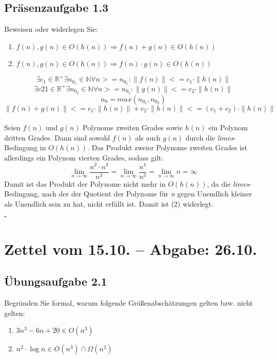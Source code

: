 \documentclass{article}
\begin{document}
\subsection{Präsenzaufgabe 1.3}
Beweisen oder widerlegen Sie:
\begin{enumerate}
	\item $ f(n),g(n) \in O(h(n)) \Rightarrow f(n)+g(n) \in O(h(n)) $
	\item $ f(n),g(n) \in O(h(n)) \Rightarrow f(n) \cdot g(n) \in O(h(n)) $
\end{enumerate}
\vspace{1cm}
\[
	\exists c_1 \in \mathbb{R}^+ \exists n_{0_1} \in \mathbb{N} \forall n >= n_{0_1} : \|f(n)\| <= c_1 \cdot \|h(n)\|
\]
\[
	\exists c21 \in \mathbb{R}^+ \exists n_{0_2} \in \mathbb{N} \forall n >= n_{0_2} : \|g(n)\| <= c_2 \cdot \|h(n)\|
\]
\[
	n_0 = max(n_{0_1},n_{0_2})
\]
\[
	\|f(n)+g(n)\| <= c_1\cdot\|h(n)\|+c_2\cdot\|h(n)\| <= (c_1+c_2)\cdot\|h(n)\|
\]
\vspace{0.5cm}\\
Seien $f(n)$ und $g(n)$ Polynome zweiten Grades sowie $h(n)$ ein Polynom dritten Grades.
Dann sind sowohl $f(n)$ als auch $g(n)$ durch die \textit{limes}-Bedingung in $O(h(n))$.
Das Produkt zweier Polynome zweiten Grades ist allerdings ein Polynom vierten Grades, sodass gilt:
\begin{equation*}
	\lim_{n\rightarrow\infty}\frac{n^2 \cdot n^2}{n^3}=\lim_{n\rightarrow\infty}\frac{n^4}{n^3}=\lim_{n\rightarrow\infty}n=\infty
\end{equation*}
Damit ist das Produkt der Polynome nicht mehr in $O(h(n))$, da die \textit{limes}-Bedingung, nach der der Quotient der Polynome für \textit{n} gegen Unendlich kleiner als Unendlich sein zu hat, nicht erfüllt ist.
Damit ist (2) widerlegt.
\begin{flushright}
$\square$
\end{flushright}
\newpage
\section{Zettel vom 15.10. -- Abgabe: 26.10.}
\subsection{Übungsaufgabe 2.1}
\begin{flushright}
\begin{Large}
[~~~~\string| ~~2~]
\end{Large}
\end{flushright}
Begründen Sie formal, warum folgende Größenabschätzungen gelten bzw. nicht gelten:
\begin{enumerate}
	\item $3n^3-6n+20 \in O(n^3)$
	\item $n^2 \cdot \operatorname{log} n \in O(n^3) \cap \Omega(n^2)$
\end{enumerate}
\vspace{1cm}
\end{document}
